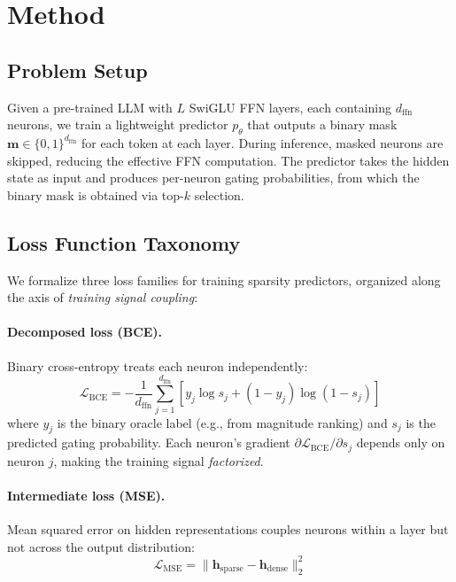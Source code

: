 \documentclass[11pt,a4paper]{article}
\begin{document}
\section{Method}
\label{sec:method}

\subsection{Problem Setup}

Given a pre-trained LLM with $L$ SwiGLU FFN layers, each containing $d_{\text{ffn}}$ neurons, we train a lightweight predictor $p_\theta$ that outputs a binary mask $\mathbf{m} \in \{0,1\}^{d_{\text{ffn}}}$ for each token at each layer. During inference, masked neurons are skipped, reducing the effective FFN computation. The predictor takes the hidden state as input and produces per-neuron gating probabilities, from which the binary mask is obtained via top-$k$ selection.

\subsection{Loss Function Taxonomy}
\label{sec:loss-taxonomy}

We formalize three loss families for training sparsity predictors, organized along the axis of \emph{training signal coupling}:

\paragraph{Decomposed loss (BCE).} Binary cross-entropy treats each neuron independently:
\begin{equation}
    \mathcal{L}_{\text{BCE}} = -\frac{1}{d_{\text{ffn}}} \sum_{j=1}^{d_{\text{ffn}}} \left[ y_j \log s_j + (1-y_j) \log(1-s_j) \right]
\end{equation}
where $y_j$ is the binary oracle label (e.g., from magnitude ranking) and $s_j$ is the predicted gating probability. Each neuron's gradient $\partial \mathcal{L}_{\text{BCE}} / \partial s_j$ depends only on neuron $j$, making the training signal \emph{factorized}.

\paragraph{Intermediate loss (MSE).} Mean squared error on hidden representations couples neurons within a layer but not across the output distribution:
\begin{equation}
    \mathcal{L}_{\text{MSE}} = \| \mathbf{h}_{\text{sparse}} - \mathbf{h}_{\text{dense}} \|_2^2
\end{equation}
\end{document}
